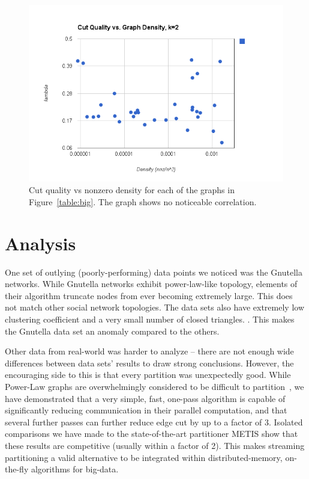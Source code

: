 \begin{figure}[h!]
\centering
\includegraphics[width=0.8\columnwidth] {figures/cutvsdens}
\caption[Caption for]{Cut quality vs nonzero density for each of the graphs in Figure~\ref{table:big}. The graph shows no noticeable correlation.}
\end{figure}


\section{Analysis}

One set of outlying (poorly-performing) data points we noticed was the Gnutella networks. While Gnutella networks exhibit power-law-like topology, elements of their algorithm truncate nodes from ever becoming extremely large. This does not match other social network topologies. The data sets also have extremely low clustering coefficient and a very small number of closed triangles. \cite{Ripeanu:2002:MGN:613352.613670}. This makes the Gnutella data set an anomaly compared to the others. 

Other data from real-world was harder to analyze -- there are not enough wide differences between data sets' results to draw strong conclusions. However, the encouraging side to this is that every partition was unexpectedly good. While Power-Law graphs are overwhelmingly considered to be difficult to partition~\cite{Abou-Rjeili:2006:MAP:1898953.1899055}, we have demonstrated that a very simple, fast, one-pass algorithm is capable of significantly reducing communication in their parallel computation, and that several further passes can further reduce edge cut by up to a factor of 3. Isolated comparisons we have made to the state-of-the-art partitioner METIS show that these results are competitive (usually within a factor of 2). This makes streaming partitioning a valid alternative to be integrated within distributed-memory, on-the-fly algorithms for big-data.

